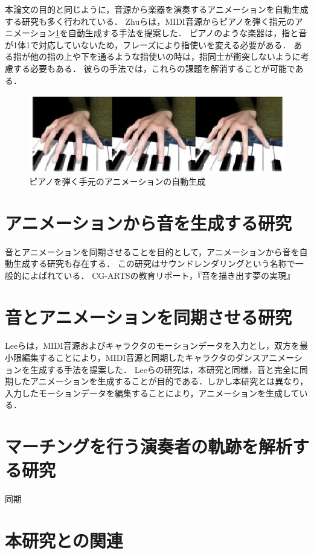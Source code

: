 \indent
本論文の目的と同じように，音源から楽器を演奏するアニメーションを自動生成する研究も多く行われている．
Zhuら\cite{piano}は，MIDI音源からピアノを弾く指元のアニメーション\ref{fig:piano}を自動生成する手法を提案した．
ピアノのような楽器は，指と音が1体1で対応していないため，フレーズにより指使いを変える必要がある．
ある指が他の指の上や下を通るような指使いの時は，指同士が衝突しないように考慮する必要もある．
彼らの手法では，これらの課題を解消することが可能である．
\begin{figure}[h]
	\centering
	\includegraphics[width=15cm]{fig/chap2/piano.eps}
	\caption{ピアノを弾く手元のアニメーションの自動生成}
	\label{fig:piano}
\end{figure}

\section{アニメーションから音を生成する研究}\label{sec:generate_sound}
音とアニメーションを同期させることを目的として，アニメーションから音を自動生成する研究も存在する．
この研究はサウンドレンダリングという名称で一般的によばれている．
CG-ARTSの教育リポート，『音を描き出す夢の実現』



\section{音とアニメーションを同期させる研究} \label{sec:synchronization}
Leeら\cite{Lee}は，MIDI音源およびキャラクタのモーションデータを入力とし，双方を最小限編集することにより，MIDI音源と同期したキャラクタのダンスアニメーションを生成する手法を提案した．
Leeらの研究は，本研究と同様，音と完全に同期したアニメーションを生成することが目的である．しかし本研究とは異なり，入力したモーションデータを編集することにより，アニメーションを生成している．

\section{マーチングを行う演奏者の軌跡を解析する研究} \label{sec:marching}
同期

\section{本研究との関連}\label{sec:compere}



